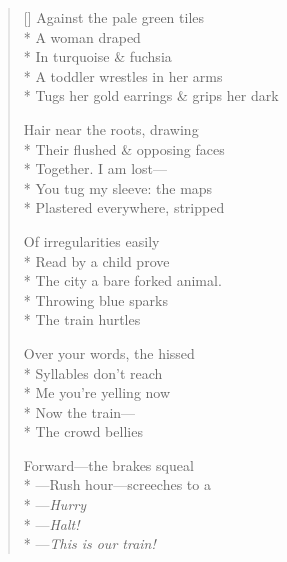 \label{ch:leaning}
\settowidth{\versewidth}{Tugs her gold earrings \& grips her dark}
\begin{verse}[\versewidth]
Against the pale green tiles\\*
A woman draped\\*
In turquoise \& fuchsia\\*
A toddler wrestles in her arms\\*
Tugs her gold earrings \& grips her dark

Hair near the roots, drawing\\*
Their flushed \& opposing faces\\*
Together.     I am lost---\\*
You tug my sleeve: the maps\\*
Plastered everywhere, stripped

Of irregularities easily\\*
Read by a child prove\\*
The city a bare forked animal.\\*
Throwing blue sparks\\*
The train hurtles

Over your words, the hissed\\*
Syllables don't reach\\*
Me     you're yelling now\\*
Now the train---\\*
The crowd bellies

Forward---the brakes squeal\\*
---Rush hour---screeches to a\\*
---\textit{Hurry}\\*
---\textit{Halt!}\\*
---\textit{This is our train!}
\end{verse}
